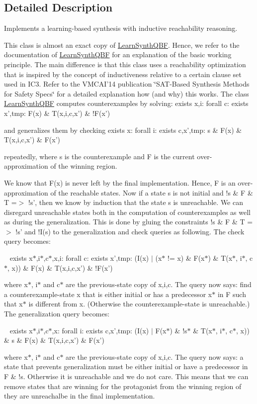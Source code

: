 \subsection{Detailed Description}
Implements a learning-\/based synthesis with inductive reachability reasoning. 

This class is almost an exact copy of \hyperlink{classLearnSynthQBF}{Learn\-Synth\-Q\-B\-F}. Hence, we refer to the documentation of \hyperlink{classLearnSynthQBF}{Learn\-Synth\-Q\-B\-F} for an explanation of the basic working principle. The main difference is that this class uses a reachability optimization that is inspired by the concept of inductiveness relative to a certain clause set used in I\-C3. Refer to the V\-M\-C\-A\-I'14 publication \char`\"{}\-S\-A\-T-\/\-Based Synthesis Methods for Safety Specs\char`\"{} for a detailed explanation how (and why) this works. The class \hyperlink{classLearnSynthQBF}{Learn\-Synth\-Q\-B\-F} computes counterexamples by solving\-: exists x,i\-: forall c\-: exists x',tmp\-: F(x) \& T(x,i,c,x') \& !\-F(x') \par
 and generalizes them by checking exists x\-: forall i\-: exists c,x',tmp\-: s \& F(x) \& T(x,i,c,x') \& F(x') \par
 repeatedly, where s is the counterexample and F is the current over-\/approximation of the winning region.

We know that F(x) is never left by the final implementation. Hence, F is an over-\/approximation of the reachable states. Now if a state s is not initial and !s \& F \& T =$>$ !s', then we know by induction that the state s is unreachable. We can disregard unreachable states both in the computation of counterexamples as well as during the generalization. This is done by gluing the constraints !s \& F \& T =$>$ !s' and !\-I(s) to the generalization and check queries as following. The check query becomes\-: \par
 ~ exists x$\ast$,i$\ast$,c$\ast$,x,i\-: forall c\-: exists x',tmp\-: (I(x) $\vert$ (x$\ast$ != x) \& F(x$\ast$) \& T(x$\ast$, i$\ast$, c$\ast$, x)) \& F(x) \& T(x,i,c,x') \& !\-F(x') \par
 where x$\ast$, i$\ast$ and c$\ast$ are the previous-\/state copy of x,i,c. The query now says\-: find a counterexample-\/state x that is either initial or has a predecessor x$\ast$ in F such that x$\ast$ is different from x. (Otherwise the counterexample-\/state is unreachable.) The generalization query becomes\-: \par
 ~ exists x$\ast$,i$\ast$,c$\ast$,x\-: forall i\-: exists c,x',tmp\-: (I(x) $\vert$ F(x$\ast$) \& !s$\ast$ \& T(x$\ast$, i$\ast$, c$\ast$, x)) \& s \& F(x) \& T(x,i,c,x') \& F(x') \par
 where x$\ast$, i$\ast$ and c$\ast$ are the previous-\/state copy of x,i,c. The query now says\-: a state that prevents generalization must be either initial or have a predecessor in F \& !s. Otherwise it is unreachable and we do not care. This means that we can remove states that are winning for the protagonist from the winning region of they are unreachalbe in the final implementation.

